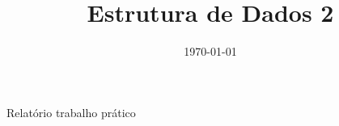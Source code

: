\documentclass[12pt]{article}
\begin{document}
\title{Estrutura de Dados 2}
\date{\today}

\maketitle

\vspace{40pt}

\begin{center}
Relatório trabalho prático
\end{center}

\vspace{80pt}


\newpage


\end{document}
